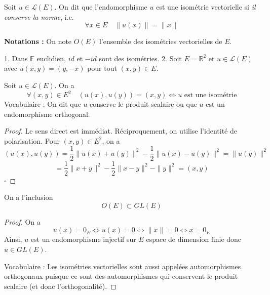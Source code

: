 \begin{definition}
\label{def:2}

Soit $u \in \mathcal{L}(E)$. On dit que l'endomorphisme $u$ est une isométrie vectorielle si \textit{il conserve la norme}, i.e.
\[
\forall x \in E \quad \|u(x)\| = \|x\|
\]

\textbf{Notations :} On note $O(E)$ l'ensemble des isométries vectorielles de $E$.

\end{definition}

\begin{examples}

1. Dans $\mathbb{E}$ euclidien, $id$ et $-id$ sont des isométries.
2. Soit $E = \mathbb{R}^2$ et $u \in \mathcal{L}(E)$ avec $u(x, y) = (y, -x)$ pour tout $(x, y) \in E$.

\end{examples}

\begin{proposition}
\label{prop:6}

Soit $u \in \mathcal{L}(E)$. On a
\[
\forall (x, y) \in E^2 \quad (u(x), u(y)) = (x, y) \iff u \text{ est une isométrie}
\]
Vocabulaire : On dit que $u$ conserve le produit scalaire ou que $u$ est un endomorphisme orthogonal.

\end{proposition}

\begin{proof}

Le sens direct est immédiat. Réciproquement, on utilise l'identité de polarisation. Pour $(x, y) \in E^2$, on a
\[
(u(x), u(y)) = \frac{1}{2} \|u(x) + u(y)\|^2 - \frac{1}{2} \|u(x) - u(y)\|^2 = \|u(y)\|^2
\]
\[
= \frac{1}{2} \|x + y\|^2 - \frac{1}{2} \|x - y\|^2 - \|y\|^2 = (x, y)
\]
\hfill $\square$

\end{proof}

\begin{proposition}
\label{prop:7}

On a l'inclusion
\[
O(E) \subset GL(E)
\]

\end{proposition}

\begin{proof}

On a
\[
u(x) = 0_E \iff u(x) = 0 \iff \|x\| = 0 \iff x = 0_E
\]
Ainsi, $u$ est un endomorphisme injectif sur $E$ espace de dimension finie donc $u \in GL(E)$.

Vocabulaire : Les isométries vectorielles sont aussi appelées automorphismes orthogonaux puisque ce sont des automorphismes qui conservent le produit scalaire (et donc l'orthogonalité).

\end{proof}

